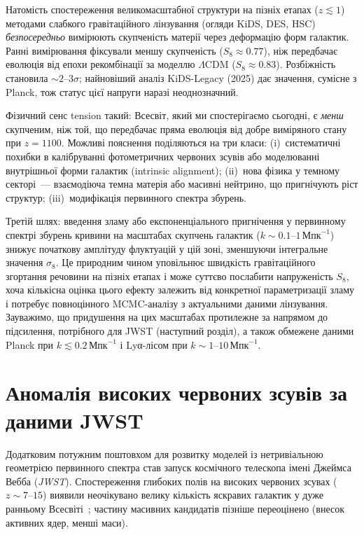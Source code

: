Натомість спостереження великомасштабної структури на пізніх етапах
($z \lesssim 1$) методами слабкого гравітаційного лінзування (огляди KiDS,
DES, HSC) \emph{безпосередньо} вимірюють скупченість матерії через деформацію
форм галактик. Ранні вимірювання фіксували меншу скупченість ($S_8 \approx 0.77$),
ніж передбачає еволюція від епохи рекомбінації за моделлю $\Lambda$CDM
($S_8 \approx 0.83$). Розбіжність становила $\sim 2$--$3\sigma$; найновіший аналіз KiDS-Legacy (2025)
дає значення, сумісне з Planck, тож статус цієї напруги наразі неоднозначний.

Фізичний сенс tension такий: Всесвіт, який ми спостерігаємо сьогодні, є
\emph{менш} скупченим, ніж той, що передбачає пряма еволюція від добре
виміряного стану при $z=1100$. Можливі пояснення поділяються на три класи:
(i)~систематичні похибки в калібруванні фотометричних червоних зсувів або
моделюванні внутрішньої форми галактик (intrinsic alignment);
(ii)~нова фізика у темному секторі~--- взаємодіюча темна матерія або масивні
нейтрино, що пригнічують ріст структур;
(iii)~модифікація первинного спектра збурень.

Третій шлях: введення зламу або експоненціального
пригнічення у первинному спектрі збурень кривини на масштабах скупчень
галактик ($k \sim 0.1$--$1\,\text{Мпк}^{-1}$) знижує початкову
амплітуду флуктуацій у цій зоні, зменшуючи інтегральне значення $\sigma_8$.
Це природним чином уповільнює швидкість гравітаційного згортання речовини
на пізніх етапах і може суттєво послабити напруженість $S_8$, хоча кількісна
оцінка цього ефекту залежить від конкретної параметризації зламу і потребує
повноцінного MCMC-аналізу з актуальними даними лінзування. Зауважимо, що придушення
на цих масштабах протилежне за напрямом до підсилення, потрібного для JWST (наступний розділ),
а також обмежене даними Planck при $k\lesssim0.2\,\text{Мпк}^{-1}$ і Lyα-лісом при $k\sim1$--$10\,\text{Мпк}^{-1}$.

\section{Аномалія високих червоних зсувів за даними JWST}
\label{sec:jwst}

Додатковим потужним поштовхом для розвитку моделей із нетривіальною геометрією первинного спектра став запуск космічного телескопа імені Джеймса Вебба (\emph{JWST}). Спостереження глибоких полів на високих червоних зсувах ($z \sim 7\text{--}15$) виявили неочікувано велику кількість яскравих галактик у дуже ранньому Всесвіті~\cite{Labbe2023,Finkelstein2023}; частину масивних кандидатів пізніше переоцінено (внесок активних ядер, менші маси).

